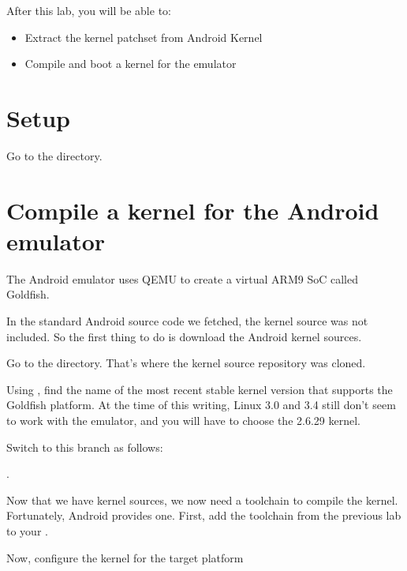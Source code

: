 
After this lab, you will be able to:
\begin{itemize}
  \item Extract the kernel patchset from Android Kernel
  \item Compile and boot a kernel for the emulator
\end{itemize}

\section{Setup}

Go to the  directory.

\section{Compile a kernel for the Android emulator}

The Android emulator uses QEMU to create a virtual ARM9 SoC called
Goldfish.

In the standard Android source code we fetched, the kernel source was
not included.  So the first thing to do is download the Android kernel
sources.


Go to the  directory. That's where the kernel source
repository was cloned.

Using , find the name of the most recent stable
kernel version that supports the Goldfish platform. At the time of
this writing, Linux 3.0 and 3.4 still don't seem to work with the
emulator, and you will have to choose the 2.6.29 kernel.

Switch to this branch as follows:

.

Now that we have kernel sources, we now need a toolchain to compile
the kernel. Fortunately, Android provides one. First, add the
toolchain from the previous lab to your .


Now, configure the kernel for the target platform



